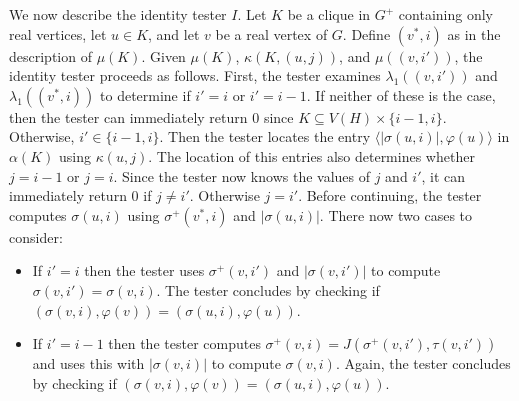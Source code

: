 \documentclass{patmorin}
\begin{document}
  We now describe the identity tester $I$.  Let $K$ be a clique in $G^+$ containing only real vertices, let $u\in K$, and let $v$ be a real vertex of $G$.  Define $(v^*,i)$ as in the description of $\mu(K)$.   Given $\mu(K)$, $\kappa(K,(u,j))$, and $\mu((v,i'))$, the identity tester proceeds as follows. First, the tester examines $\lambda_1((v,i'))$ and $\lambda_1((v^*,i))$ to determine if $i'=i$ or $i'=i-1$.  If neither of these is the case, then the tester can immediately return $0$ since $K\subseteq V(H)\times \{i-1,i\}$.  Otherwise, $i'\in\{i-1,i\}$.  Then the tester locates the entry $\langle |\sigma(u,i)|,\varphi(u)\rangle$ in $\alpha(K)$ using $\kappa(u,j)$. The location of this entries also determines whether $j=i-1$ or $j=i$.  Since the tester now knows the values of $j$ and $i'$, it can immediately return $0$ if $j\neq i'$. Otherwise $j=i'$.  Before continuing, the tester computes $\sigma(u,i)$ using $\sigma^+(v^*,i)$ and $|\sigma(u,i)|$.
  There now two cases to consider:
  \begin{itemize}
    \item If $i'=i$ then the tester uses $\sigma^+(v,i')$ and $|\sigma(v,i')|$ to compute $\sigma(v,i')=\sigma(v,i)$.  The tester concludes by checking if $(\sigma(v,i),\varphi(v))=(\sigma(u,i),\varphi(u))$.

    \item If $i'=i-1$ then the tester computes $\sigma^+(v,i)=J(\sigma^+(v,i'),\tau(v,i'))$ and uses this with $|\sigma(v,i)|$ to compute $\sigma(v,i)$.  Again, the tester concludes by checking if $(\sigma(v,i),\varphi(v))=(\sigma(u,i),\varphi(u))$.
  \end{itemize}
\end{document}
